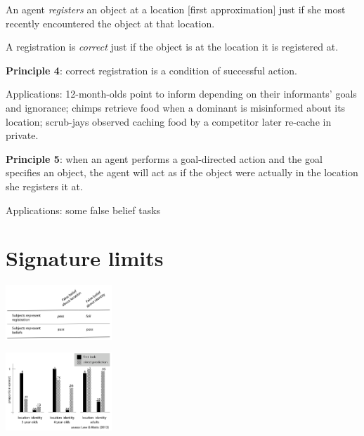 \documentclass[11pt]{extarticle}
\begin{document}
\begin{multicols}{3}
An agent \emph{registers} an object at a location [first approximation] just if she most recently encountered the object at that location.

A registration is \emph{correct} just if the object is at the location it is registered at.

\textbf{Principle 4}: correct registration is a condition of successful action.

Applications: 12-month-olds point to inform depending on their informants’ goals and ignorance;\citep{Liszkowski:2008al} chimps retrieve food when a dominant is misinformed about its location;\citep{Hare:2001ph} scrub-jays observed caching food by a competitor later re-cache in private.\citep{Clayton:2007fh,Emery:2007ze}

 
\textbf{Principle 5}: when an agent performs a goal-directed action and the goal specifies an object, the agent will act as if the object were actually in the location she registers it at.

Applications: some false belief tasks \citep{Onishi:2005hm,Southgate:2007js,Buttelmann:2009gy}


\section{Signature limits}
\begin{center}
  \includegraphics[width=0.3\textwidth]{fig1.png}
\end{center}

\begin{center}
  \includegraphics[width=0.3\textwidth]{fig2.png}\citep{low:2010_preschoolers}
\end{center}

\footnotesize 


\end{multicols}
\end{document}
